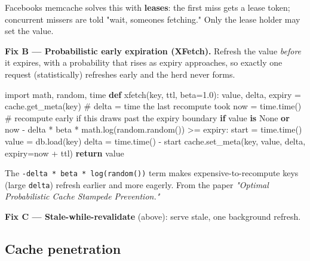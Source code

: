 \documentclass[11pt]{article}
\newenvironment{Shaded}{\begin{snugshade}}{\end{snugshade}}
\newcommand{\CommentTok}[1]{\textcolor[rgb]{0.48,0.49,0.49}{#1}}
\newcommand{\ControlFlowTok}[1]{\textcolor[rgb]{0.99,0.74,0.29}{\textbf{#1}}}
\newcommand{\FloatTok}[1]{\textcolor[rgb]{0.96,0.45,0.00}{#1}}
\newcommand{\ImportTok}[1]{\textcolor[rgb]{0.15,0.68,0.38}{#1}}
\newcommand{\KeywordTok}[1]{\textcolor[rgb]{0.81,0.81,0.76}{\textbf{#1}}}
\newcommand{\NormalTok}[1]{\textcolor[rgb]{0.81,0.81,0.76}{#1}}
\newcommand{\OperatorTok}[1]{\textcolor[rgb]{0.81,0.81,0.76}{#1}}
\newcommand{\VariableTok}[1]{\textcolor[rgb]{0.15,0.68,0.68}{#1}}
\begin{document}
Facebook\textquotesingle s memcache solves this with \textbf{leases}: the first miss gets a lease token; concurrent missers are told "wait, someone\textquotesingle s fetching." Only the lease holder may set the value.

\textbf{Fix B --- Probabilistic early expiration (XFetch).} Refresh the value \emph{before} it expires, with a probability that rises as expiry approaches, so exactly one request (statistically) refreshes early and the herd never forms.


\begin{Shaded}
\begin{Highlighting}[]
\ImportTok{import}\NormalTok{ math, random, time}
\KeywordTok{def}\NormalTok{ xfetch(key, ttl, beta}\OperatorTok{=}\FloatTok{1.0}\NormalTok{):}
\NormalTok{    value, delta, expiry }\OperatorTok{=}\NormalTok{ cache.get\_meta(key)   }\CommentTok{\# delta = time the last recompute took}
\NormalTok{    now }\OperatorTok{=}\NormalTok{ time.time()}
    \CommentTok{\# recompute early if this draws past the expiry boundary}
    \ControlFlowTok{if}\NormalTok{ value }\KeywordTok{is} \VariableTok{None} \KeywordTok{or}\NormalTok{ now }\OperatorTok{{-}}\NormalTok{ delta }\OperatorTok{*}\NormalTok{ beta }\OperatorTok{*}\NormalTok{ math.log(random.random()) }\OperatorTok{\textgreater{}=}\NormalTok{ expiry:}
\NormalTok{        start }\OperatorTok{=}\NormalTok{ time.time()}
\NormalTok{        value }\OperatorTok{=}\NormalTok{ db.load(key)}
\NormalTok{        delta }\OperatorTok{=}\NormalTok{ time.time() }\OperatorTok{{-}}\NormalTok{ start}
\NormalTok{        cache.set\_meta(key, value, delta, expiry}\OperatorTok{=}\NormalTok{now }\OperatorTok{+}\NormalTok{ ttl)}
    \ControlFlowTok{return}\NormalTok{ value}
\end{Highlighting}
\end{Shaded}

The \texttt{-delta\ *\ beta\ *\ log(random())} term makes expensive-to-recompute keys (large \texttt{delta}) refresh earlier and more eagerly. From the paper \emph{"Optimal Probabilistic Cache Stampede Prevention."}

\textbf{Fix C --- Stale-while-revalidate} (above): serve stale, one background refresh.

\subsection{Cache penetration}\label{cache-penetration}
\end{document}
